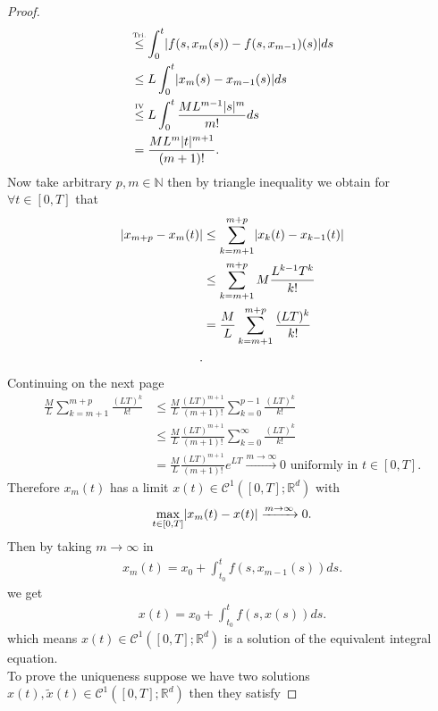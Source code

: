 \begin{proof}
\begin{align*}
                          &\myS{Tri.}{\le }  \int_0^{t} \abs{f(s,x_m(s))-f(s,x_{m-1})(s)} ds \\
                          &\le L \int_0^{t} \abs{x_m(s) - x_{m-1}(s)}   ds \\
                          &\myS{IV}{\le } L \int_0^{t} \frac{ML^{m-1}\abs{s}^{m}  }{m!}  ds\\
                          &= \frac{ML^{m}\abs{t}^{m+1} }{(m+1)!}
 .\end{align*}
 Now take arbitrary $p,m \in  \mathbb{N}$  then by triangle inequality we obtain for $\forall  t \in  [0,T]$ that 
 \begin{align*}
   \lvert x_{m+p} - x_{m}(t)\rvert &\le  \sum_{k=m+1}^{m+p}  \lvert x_k(t) - x_{k-1}(t)\rvert \\
                            &\le \sum_{k=m+1}^{m+p} M \frac{L^{k-1}T^{k}  }{k!} \\
                            &= \frac{M}{L} \sum_{k=m+1}^{m+p} \frac{(LT)^{k} }{k!}\\
 .\end{align*}
 Continuing on the next page
 \begin{align*}
  \frac{M}{L} \sum_{k=m+1}^{m+p} \frac{(LT)^{k} }{k!} &\le \frac{M}{L} \frac{(LT)^{m+1} }{(m+1)!} \sum_{k=0}^{p-1}\frac{(LT)^{k} }{k!} \\
                                                      &\le \frac{M}{L}\frac{(LT)^{m+1} }{(m+1)!}\sum_{k=0}^{\infty} \frac{(LT)^{k} }{k!} \\
                                                      &= \frac{M}{L}\frac{(LT)^{m+1} }{(m+1)!} e^{LT} \xrightarrow{m\to \infty} 0 \text{ uniformly in } t\in [0,T]
 .\end{align*}
 Therefore $x_m(t)$ has a limit $x(t) \in  \mathcal{C}^{1}([0,T];\mathbb{R}^{d} ) $ with 
 \begin{align*}
   \max_{t \in  [0,T]} \lvert x_m(t) - x(t)\rvert \xrightarrow{m\to \infty} 0
 .\end{align*}
 Then by taking $m\to \infty$ in 
 \begin{align*}
   x_m(t) = x_{0} + \int_{t_{0}}^{t} f(s,x_{m-1}(s)) ds
 .\end{align*}
 we get 
 \begin{align*}
   x(t) = x_{0} + \int_{t_{0}}^{t} f(s,x(s)) ds
 .\end{align*}
 which means $x(t) \in  \mathcal{C}^{1}([0,T];\mathbb{R}^{d} ) $ is a solution of the equivalent integral equation.\\[1ex]
 To prove the uniqueness suppose we have two solutions $x(t),\tilde{x}(t) \in  \mathcal{C}^{1}([0,T];\mathbb{R}^{d} )  $ then they satisfy 

\end{proof}
